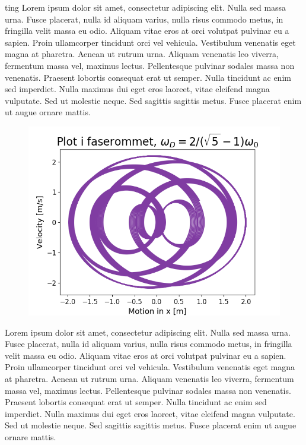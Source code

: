 \documentclass[norsk,a4paper,12pt]{article}
\begin{document}
ting
Lorem ipsum dolor sit amet, consectetur adipiscing elit. Nulla sed massa urna. Fusce placerat, nulla id aliquam varius, nulla risus commodo metus, in fringilla velit massa eu odio. Aliquam vitae eros at orci volutpat pulvinar eu a sapien. Proin ullamcorper tincidunt orci vel vehicula. Vestibulum venenatis eget magna at pharetra. Aenean ut rutrum urna. Aliquam venenatis leo viverra, fermentum massa vel, maximus lectus. Pellentesque pulvinar sodales massa non venenatis. Praesent lobortis consequat erat ut semper. Nulla tincidunt ac enim sed imperdiet. Nulla maximus dui eget eros laoreet, vitae eleifend magna vulputate. Sed ut molestie neque. Sed sagittis sagittis metus. Fusce placerat enim ut augue ornare mattis.
\\

\begin{figure}
\includegraphics[scale=0.8]{Oppgave4del2.png}
\end{figure}


Lorem ipsum dolor sit amet, consectetur adipiscing elit. Nulla sed massa urna. Fusce placerat, nulla id aliquam varius, nulla risus commodo metus, in fringilla velit massa eu odio. Aliquam vitae eros at orci volutpat pulvinar eu a sapien. Proin ullamcorper tincidunt orci vel vehicula. Vestibulum venenatis eget magna at pharetra. Aenean ut rutrum urna. Aliquam venenatis leo viverra, fermentum massa vel, maximus lectus. Pellentesque pulvinar sodales massa non venenatis. Praesent lobortis consequat erat ut semper. Nulla tincidunt ac enim sed imperdiet. Nulla maximus dui eget eros laoreet, vitae eleifend magna vulputate. Sed ut molestie neque. Sed sagittis sagittis metus. Fusce placerat enim ut augue ornare mattis.
\\
\end{document}
